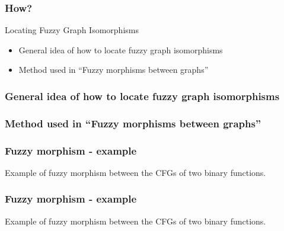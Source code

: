 


\begin{frame}
	\frametitle{How?}

	\begin{block}{Locating Fuzzy Graph Isomorphisms}
		\begin{itemize}
			\item General idea of how to locate fuzzy graph isomorphisms
			\item Method used in ``Fuzzy morphisms between graphs''
		\end{itemize}
	\end{block}
\end{frame}


\begin{frame}
	\frametitle{General idea of how to locate fuzzy graph isomorphisms}


\end{frame}

\begin{frame}
	\frametitle{Method used in ``Fuzzy morphisms between graphs''}

\end{frame}



\begin{frame}
	\frametitle{Fuzzy morphism - example}
	Example of fuzzy morphism between the CFGs of two binary functions.

\end{frame}

\begin{frame}[noframenumbering]
	\frametitle{Fuzzy morphism - example}
	Example of fuzzy morphism between the CFGs of two binary functions.

\end{frame}
